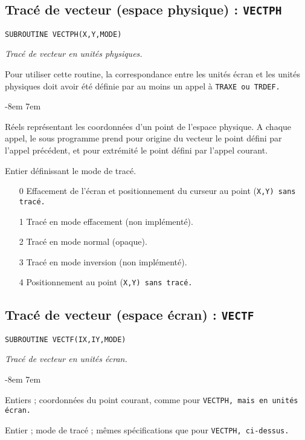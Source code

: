 \documentclass[a4paper,12pt,titlepage]{article}
\newcommand{\darg}[1]{\item[\tt #1\rm]}
\newcommand{\fsub}[1]{\hbox {\tt SUBROUTINE #1  } \medskip }
\newenvironment{argdesc}{\begin{list}{-}{\leftmargin 8em \labelwidth 7em}}%
{\end{list}}
\begin{document}
\subsection{Trac\'e  de  vecteur (espace physique) : \tt VECTPH}
\fsub{VECTPH(X,Y,MODE)}

    \em Trac\'e  de  vecteur en unit\'es physiques.\em

  Pour utiliser cette routine, la correspondance entre les unit\'es
\'ecran et les unit\'es physiques doit avoir \'et\'e d\'efinie par au
moins un appel \`a \tt TRAXE\rm\ ou \tt TRDEF\rm.

\begin{argdesc}
    \darg{X,Y :} R\'eels  repr\'esentant  les coordonn\'ees d'un  point  de 
              l'espace physique. A chaque appel, le sous programme 
              prend  pour origine du vecteur le point  d\'efini  par 
              l'appel pr\'ec\'edent, et pour extr\'emit\'e le point d\'efini 
              par l'appel courant.
    \darg{MODE :}      Entier d\'efinissant le mode de trac\'e.

              \begin{itemize}
              \item[0]    Effacement  de  l'\'ecran  et  positionnement  du 
                   curseur au point (\tt X,Y\rm ) sans trac\'e.
              \item[1]    Trac\'e en mode effacement (non impl\'ement\'e).
              \item[2]    Trac\'e en mode normal (opaque).
              \item[3]    Trac\'e  en  mode inversion (non impl\'ement\'e).
              \item[4]    Positionnement au point (\tt X,Y\rm ) sans trac\'e.
              \end{itemize}
\end{argdesc}

\subsection{Trac\'e de vecteur (espace \'ecran) : \tt VECTF}
\fsub{VECTF(IX,IY,MODE)}

    \em Trac\'e de vecteur en unit\'es \'ecran.\em

\begin{argdesc}
    \darg{IX,IY :} Entiers ;   coordonn\'ees du point courant,  comme  pour 
              \tt VECTPH\rm ,  mais en unit\'es \'ecran. 

    \darg{MODE :} Entier ; mode de trac\'e ; m\^emes sp\'ecifications que
              pour \tt VECTPH\rm , ci-dessus.
\end{argdesc}
\end{document}
